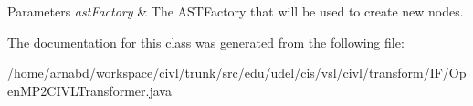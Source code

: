\begin{DoxyParams}{Parameters}
{\em ast\+Factory} & The A\+S\+T\+Factory that will be used to create new nodes. \\
\hline
\end{DoxyParams}


The documentation for this class was generated from the following file\+:\begin{DoxyCompactItemize}
\item 
/home/arnabd/workspace/civl/trunk/src/edu/udel/cis/vsl/civl/transform/\+I\+F/Open\+M\+P2\+C\+I\+V\+L\+Transformer.\+java\end{DoxyCompactItemize}
